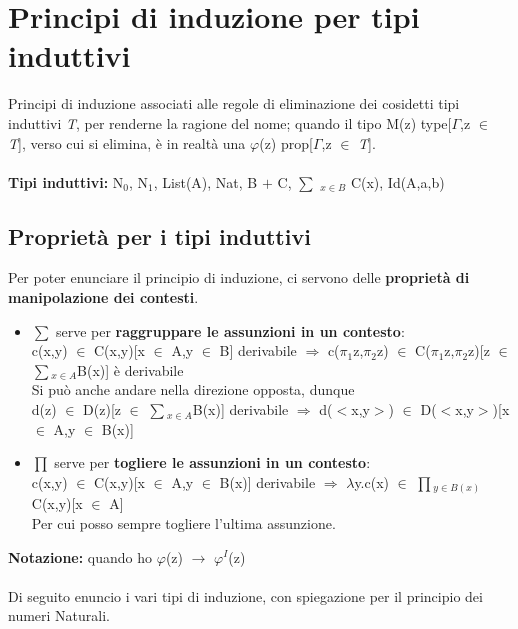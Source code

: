 \chapter{Principi di induzione per tipi induttivi}
\label{cap:principi-di-induzione-per-tipi-induttivi}
Principi di induzione associati alle regole di eliminazione dei cosidetti tipi induttivi \textit{T}, per renderne la ragione del nome; quando il tipo M(z) type[$\Gamma$,z $\in$ \textit{T}], verso cui si elimina, \`e in realt\`a una $\varphi$(z) prop[$\Gamma$,z $\in$ \textit{T}].\\\\
\noindent
\textbf{Tipi induttivi:} N$_0$, N$_1$, List(A), Nat, B $+$ C, {\scriptsize $\sum$} $_{x \in B}$ C(x), Id(A,a,b)\\

\section{Propriet\`a per i tipi induttivi}
\label{sec:prorieta-per-i-tipi-induttivi}
Per poter enunciare il principio di induzione, ci servono delle \textbf{propriet\`a di manipolazione dei contesti}.
\begin{itemize}
\item {\scriptsize $\sum$} serve per \textbf{raggruppare le assunzioni in un contesto}:\\
c(x,y) $\in$ C(x,y)[x $\in$ A,y $\in$ B] derivabile $\Rightarrow$ c($\pi_1$z,$\pi_2$z) $\in$ C($\pi_1$z,$\pi_2$z)[z $\in$ {\scriptsize $\sum\limits$}$_{x \in A}$B(x)] \`e derivabile\\
Si pu\`o anche andare nella direzione opposta, dunque\\
d(z) $\in$ D(z)[z $\in$ {\scriptsize $\sum\limits$}$_{x \in A}$B(x)] derivabile $\Rightarrow$ d($<$x,y$>$) $\in$  D($<$x,y$>$)[x $\in$ A,y $\in$ B(x)]
\item {\scriptsize $\prod$} serve per \textbf{togliere le assunzioni in un contesto}:\\
c(x,y) $\in$ C(x,y)[x $\in$ A,y $\in$ B(x)] derivabile $\Rightarrow$ $\lambda$y.c(x) $\in$ {\scriptsize $\prod$}$_{y \in B(x)}$C(x,y)[x $\in$ A]\\
Per cui posso sempre togliere l'ultima assunzione.
\end{itemize}
\noindent
\textbf{Notazione:} quando ho $\varphi$(z) $\rightarrow$ $\varphi^I$(z) \\\\

\noindent
Di seguito enuncio i vari tipi di induzione, con spiegazione per il principio dei numeri Naturali.
